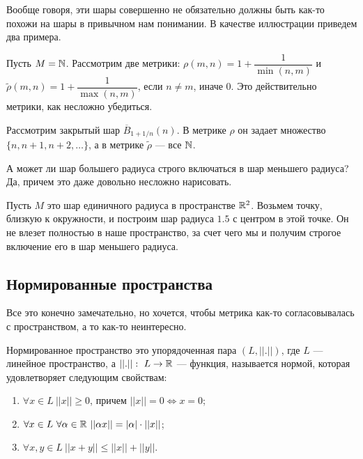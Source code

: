 \documentclass[a4paper, 12pt]{article}
\begin{document}
Вообще говоря, эти шары совершенно не обязательно должны быть как-то похожи на шары в привычном нам понимании. В качестве иллюстрации приведем два примера.
\begin{Examples}
Пусть $M = \mathbb{N}$. Рассмотрим две метрики: $\rho(m, n) = 1 + \dfrac{1}{\min(n, m)}$ и $\widetilde{\rho}(m, n) = 1 + \dfrac{1}{\max(n, m)}$, если $n \neq m$, иначе 0. Это действительно метрики, как несложно убедиться.

Рассмотрим закрытый шар $\overline{B}_{1 + 1/n}(n)$. В метрике $\rho$ он задает множество $\{n, n+1, n+2, \ldots\}$, а в метрике $\widetilde{\rho}$ --- все $\mathbb{N}$. 
\end{Examples}

\begin{Examples}
А может ли шар большего радиуса строго включаться в шар меньшего радиуса? Да, причем это даже довольно несложно нарисовать.

Пусть $M$ это шар единичного радиуса в пространстве $\mathbb{R}^2$. Возьмем точку, близкую к окружности, и построим шар радиуса $1.5$ с центром в этой точке. Он не влезет полностью в наше пространство, за счет чего мы и получим строгое включение его в шар меньшего радиуса.


\end{Examples}

\subsection*{Нормированные пространства}
Все это конечно замечательно, но хочется, чтобы метрика как-то согласовывалась с пространством, а то как-то неинтересно.

\begin{Def}
Нормированное пространство это упорядоченная пара $(L, ||.||)$, где $L$ --- линейное пространство, а $||.||:\ L \to \mathbb{R}$ --- функция, называется нормой, которая удовлетворяет следующим свойствам:
\begin{enumerate}
\item $\forall x \in L\ ||x|| \geq 0$, причем $||x|| = 0 \Leftrightarrow x = 0$;
\item $\forall x \in L\ \forall \alpha \in \mathbb{R}\ ||\alpha x|| = |\alpha|\cdot ||x||$;
\item $\forall x, y \in L\ ||x + y|| \leq ||x|| + ||y||$.
\end{enumerate}
\end{Def}
\end{document}
